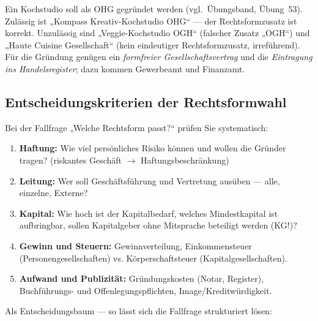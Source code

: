 \documentclass[11pt, a4paper]{article}
\begin{document}
\begin{beispiel}
Ein Kochstudio soll als OHG gegründet werden (vgl.\ Übungsband, Übung~53). Zulässig ist
„Kompass Kreativ-Kochstudio OHG`` --- der Rechtsformzusatz ist korrekt. Unzulässig sind
„Veggie-Kochstudio OGH`` (falscher Zusatz „OGH``) und „Haute Cuisine Gesellschaft``
(kein eindeutiger Rechtsformzusatz, irreführend). Für die Gründung genügen ein
\emph{formfreier Gesellschaftsvertrag} und die \emph{Eintragung ins Handelsregister};
dazu kommen Gewerbeamt und Finanzamt.
\end{beispiel}

\subsection{Entscheidungskriterien der Rechtsformwahl}

Bei der Fallfrage „Welche Rechtsform passt?{}`` prüfen Sie systematisch:

\begin{enumerate}
  \item \textbf{Haftung:} Wie viel persönliches Risiko können und wollen die Gründer
    tragen? (riskantes Geschäft $\rightarrow$ Haftungsbeschränkung)
  \item \textbf{Leitung:} Wer soll Geschäftsführung und Vertretung ausüben --- alle,
    einzelne, Externe?
  \item \textbf{Kapital:} Wie hoch ist der Kapitalbedarf, welches Mindestkapital ist
    aufbringbar, sollen Kapitalgeber ohne Mitsprache beteiligt werden (KG!)?
  \item \textbf{Gewinn und Steuern:} Gewinnverteilung, Einkommensteuer
    (Personengesellschaften) vs. Körperschaftsteuer (Kapitalgesellschaften).
  \item \textbf{Aufwand und Publizität:} Gründungskosten (Notar, Register),
    Buchführungs- und Offenlegungspflichten, Image/Kreditwürdigkeit.
\end{enumerate}

Als Entscheidungsbaum --- so lässt sich die Fallfrage strukturiert lösen:
\end{document}
